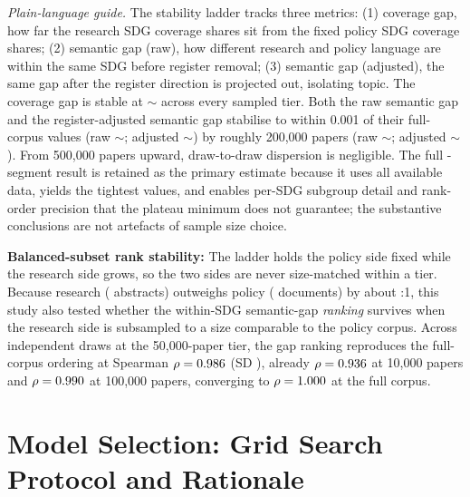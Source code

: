 \documentclass[12pt,a4paper]{article}
\let\OldSection\section
\renewcommand{\section}{\clearpage\FloatBarrier\OldSection}
\begin{document}
\noindent\textit{Plain-language guide.} The stability ladder tracks three metrics: (1) coverage gap, how far the research SDG coverage shares sit from the fixed policy SDG coverage shares; (2) semantic gap (raw), how different research and policy language are within the same SDG before register removal; (3) semantic gap (adjusted), the same gap after the register direction is projected out, isolating topic. The coverage gap is stable at $\sim$\SampleCoverageGapTwoHundredK{} across every sampled tier. Both the raw semantic gap and the register-adjusted semantic gap stabilise to within 0.001 of their full-corpus values (raw $\sim$\SampleMeanSemanticGapFull{}; adjusted $\sim$\SampleMeanSemanticGapAdjFull{}) by roughly 200{,}000 papers (raw $\sim$\SampleMeanSemanticGapTwoHundredK{}; adjusted $\sim$\SampleMeanSemanticGapAdjTwoHundredK{}). From 500{,}000 papers upward, draw-to-draw dispersion is negligible. The full \SampleStabilityFullCorpusN{}-segment result is retained as the primary estimate because it uses all available data, yields the tightest values, and enables per-SDG subgroup detail and rank-order precision that the plateau minimum does not guarantee; the substantive conclusions are not artefacts of sample size choice.

\noindent\textbf{Balanced-subset rank stability:}\label{app:balanced-subset-stability} The ladder holds the policy side fixed while the research side grows, so the two sides are never size-matched within a tier. Because research (\NResearchAbstracts{} abstracts) outweighs policy (\NPolicyDocs{} documents) by about \ResearchPolicyUnitRatio{}:1, this study also tested whether the within-SDG semantic-gap \emph{ranking} survives when the research side is subsampled to a size comparable to the policy corpus. Across \SubsetGapRhoFiftyKN{} independent draws at the 50{,}000-paper tier, the gap ranking reproduces the full-corpus ordering at Spearman $\rho = 0.986{}$ (SD \SubsetGapRhoStdFiftyK{}), already $\rho = 0.936{}$ at 10{,}000 papers and $\rho = 0.990{}$ at 100{,}000 papers, converging to $\rho = 1.000{}$ at the full corpus.


\section{Model Selection: Grid Search Protocol and Rationale}
\label{app:model-selection}
\end{document}
